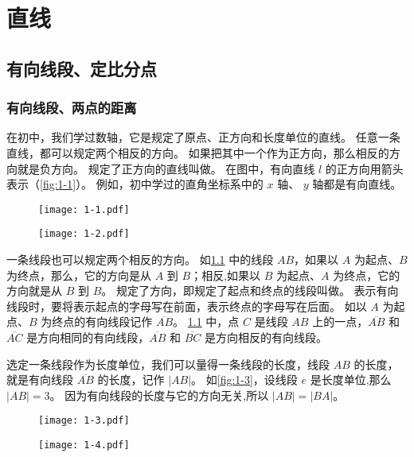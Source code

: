 \chapter{直线}\label{chp:line}
\section{有向线段、定比分点}
\subsection{有向线段、两点的距离}
在初中，我们学过数轴，它是规定了原点、正方向和长度单位的直线。
任意一条直线，都可以规定两个相反的方向。
如果把其中一个作为正方向，那么相反的方向就是负方向。
规定了正方向的直线叫做。
在图中，有向直线 $l$ 的正方向用箭头表示（\cref{fig:1-1}）。
例如，初中学过的直角坐标系中的 $x$ 轴、 $y$ 轴都是有向直线。
\begin{figure}
  \begin{minipage}[b]{0.48\linewidth}\centering
    \texttt{[image: 1-1.pdf]}
    \caption{}\label{fig:1-1}
  \end{minipage}
  \begin{minipage}[b]{0.48\linewidth}\centering
    \texttt{[image: 1-2.pdf]}
    \caption{}\label{fig:1-2}
  \end{minipage}
\end{figure}

一条线段也可以规定两个相反的方向。
如\cref{fig:1-2} 中的线段 $AB$，如果以 $A$ 为起点、$B$ 为终点，那么，它的方向是从 $A$ 到 $B$；相反,如果以 $B$ 为起点、$A$ 为终点，它的方向就是从 $B$ 到 $B$。
规定了方向，即规定了起点和终点的线段叫做。
表示有向线段时，要将表示起点的字母写在前面，表示终点的字母写在后面。
如以 $A$ 为起点、$B$ 为终点的有向线段记作 $\overline{AB}$。
\cref{fig:1-2} 中，点 $C$ 是线段 $AB$ 上的一点，$\overline{AB}$ 和 $\overline{AC}$ 是方向相同的有向线段，$\overline{AB}$ 和 $\overline{BC}$ 是方向相反的有向线段。

选定一条线段作为长度单位，我们可以量得一条线段的长度，线段 \({AB}\) 的长度，就是有向线段 $\overline{AB}$ 的长度，记作 $|AB|$。
如\cref{fig:1-3}，设线段 $e$ 是长度单位,那么 $|AB|=3$。
因为有向线段的长度与它的方向无关,所以 $|AB|=|BA|$。
\begin{figure}
  \begin{minipage}[b]{0.48\linewidth}\centering
    \texttt{[image: 1-3.pdf]}
    \caption{}\label{fig:1-3}
  \end{minipage}
  \begin{minipage}[b]{0.48\linewidth}\centering
    \texttt{[image: 1-4.pdf]}
    \caption{}\label{fig:1-4}
  \end{minipage}
\end{figure}

